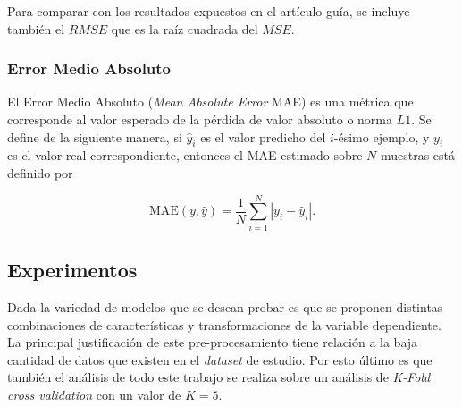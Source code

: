 \documentclass[spanish]{article}
\begin{document}
          Para comparar con los resultados expuestos en el artículo guía, se incluye también el
          $RMSE$ que es la raíz cuadrada del $MSE$.
          
        \subsubsection{Error Medio Absoluto}
        
          El Error Medio Absoluto (\emph{Mean Absolute Error} MAE) es una métrica que corresponde al valor 
          esperado de la pérdida de valor absoluto o norma $L1$. Se define de la siguiente manera, si 
          $\hat{y}_i$ es el valor predicho del $i$-ésimo ejemplo, y $y_i$ es el valor real correspondiente, 
          entonces el MAE estimado sobre $N$ muestras está definido por
          
          \begin{equation}
            \text{MAE}(y, \hat{y}) = \frac{1}{N} \sum_{i=1}^{N} \left| y_i - \hat{y}_i \right|.
          \end{equation}

  
      \subsection{Experimentos}
      
        \iffalse
        Dada la variedad de modelos que se desean probar es que se proponen distintas combinaciones de 
        características y transformaciones de la variable dependiente. La principal justificación de este 
        pre-procesamiento tiene relación a la baja cantidad de datos que existen en el \emph{dataset} de 
        estudio. Por esto último es que también el análisis de todo este trabajo se realiza sobre un 
        análisis de \emph{K-Fold cross validation} con un valor de $K=5$. \medskip
        
\end{document}
